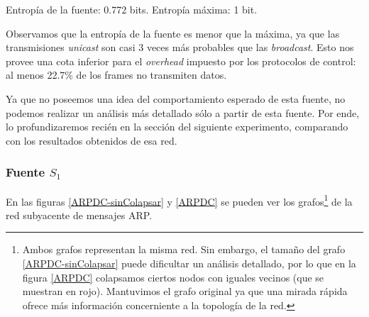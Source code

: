 \par Entropía de la fuente: 0.772 bits. Entropía máxima: 1 bit.

\par Observamos que la entropía de la fuente es menor que la máxima, ya que las transmisiones \textit{unicast} son casi 3 veces más probables que las \textit{broadcast}.
Esto nos provee una cota inferior para el \textit{overhead} impuesto por los protocolos de control: al menos 22.7\% de los frames no transmiten datos.

\par Ya que no poseemos una idea del comportamiento esperado de esta fuente, no podemos realizar un análisis más detallado sólo a partir de esta fuente.
Por ende, lo profundizaremos recién en la sección del siguiente experimento, comparando con los resultados obtenidos de esa red.


\subsubsection{Fuente $S_1$}

\par En las figuras \ref{ARPDC-sinColapsar} y \ref{ARPDC} se pueden ver los grafos\footnote{Ambos grafos representan la misma red. Sin embargo, el tamaño del grafo \ref{ARPDC-sinColapsar} puede dificultar un análisis detallado, por lo que en la figura \ref{ARPDC} colapsamos ciertos nodos con iguales vecinos (que se muestran en rojo). Mantuvimos el grafo original ya que una mirada rápida ofrece más información concerniente a la topología de la red.} de la red subyacente de mensajes ARP.

